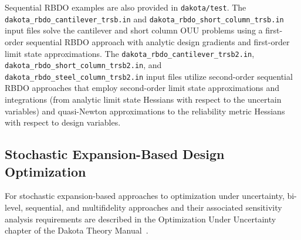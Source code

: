 Sequential RBDO examples are also provided in \texttt{dakota/test}.  
The \texttt{dakota\_rbdo\_cantilever\_trsb.in} and
\texttt{dakota\_rbdo\_short\_column\_trsb.in} input files solve 
the cantilever and short column OUU problems using a first-order
sequential RBDO approach with analytic design gradients and
first-order limit state approximations.  The
\texttt{dakota\_rbdo\_cantilever\_trsb2.in},
\texttt{dakota\_rbdo\_short\_column\_trsb2.in}, and 
\texttt{dakota\_rbdo\_steel\_column\_trsb2.in} input files 
utilize second-order sequential RBDO approaches that employ
second-order limit state approximations and integrations (from
analytic limit state Hessians with respect to the uncertain variables)
and quasi-Newton approximations to the reliability metric Hessians
with respect to design variables.

\subsection{Stochastic Expansion-Based Design Optimization} \label{adv_models:ouu:sebdo}

For stochastic expansion-based approaches to optimization under
uncertainty, bi-level, sequential, and multifidelity approaches and
their associated sensitivity analysis requirements are described in
the Optimization Under Uncertainty chapter of the Dakota Theory
Manual~\cite{TheoMan}.

